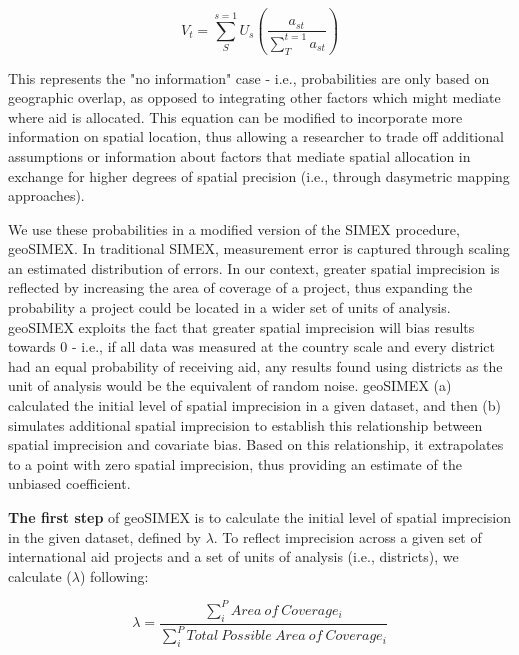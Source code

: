 \documentclass[11pt]{article}
\begin{document}
\begin{equation}\label{eq:overlaps}
V_{t} = \sum_{S}^{s=1}U_{s}\left ( \frac{a_{st}}{\sum_{T}^{t=1}a_{st}} \right )
\end{equation}

\noindent This represents the "no information" case - i.e., probabilities are only based on geographic overlap, as opposed to integrating other factors which might mediate where aid is allocated.
This equation can be modified to incorporate more information on spatial location, thus allowing a researcher to trade off additional assumptions or information about factors that mediate spatial allocation in exchange for higher degrees of spatial precision (i.e., through dasymetric mapping approaches).
\par
We use these probabilities in a modified version of the SIMEX procedure, geoSIMEX.  
In traditional SIMEX, measurement error is captured through scaling an estimated distribution of errors.
In our context, greater spatial imprecision is reflected by increasing the area of coverage of a project, thus expanding the probability a project could be located in a wider set of units of analysis. 
geoSIMEX exploits the fact that greater spatial imprecision will bias results towards 0 - i.e., if all data was measured at the country scale and every district had an equal probability of receiving aid, any results found using districts as the unit of analysis would be the equivalent of random noise.
geoSIMEX (a) calculated the initial level of spatial imprecision in a given dataset, and then (b) simulates additional spatial imprecision to establish this relationship between spatial imprecision and covariate bias. 
Based on this relationship, it extrapolates to a point with zero spatial imprecision, thus providing an estimate of the unbiased coefficient.
\par

\textbf{The first step} of geoSIMEX is to calculate the initial level of spatial imprecision in the given dataset, defined by $\lambda$.
To reflect imprecision across a given set of international aid projects and a set of units of analysis (i.e., districts), we calculate (\begin{math}\lambda\end{math}) following:

\begin{equation}\label{lambda}
\lambda = \frac{\sum_{i}^{P}Area \ of \ Coverage_i}{\sum_{i}^{P}Total \ Possible \ Area \ of \ Coverage_i}
\end{equation}
\end{document}
